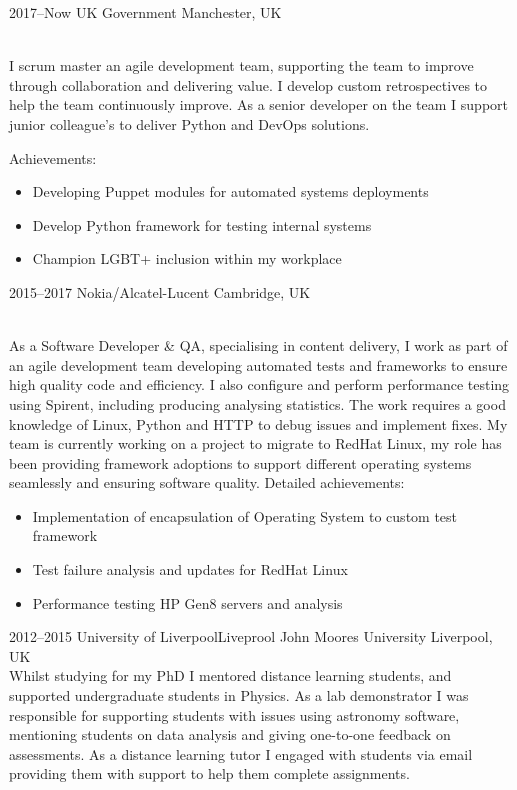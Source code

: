 \documentclass[]{cv-style}          %
\begin{document}
\begin{entrylist}
\entry
  {2017--Now}
  {UK Government}
  {Manchester, UK}
  {\\
  I scrum master an agile development team, supporting the team to improve through collaboration and delivering value.
  I develop custom retrospectives to help the team continuously improve.
  As a senior developer on the team I support junior colleague's to deliver Python and DevOps solutions.

Achievements:
\begin{itemize}
  \item Developing Puppet modules for automated systems deployments
  \item Develop Python framework for testing internal systems
  \item Champion LGBT+ inclusion within my workplace
\end{itemize}
}
\entry
  {2015--2017}
  {Nokia/Alcatel-Lucent}
  {Cambridge, UK}
  {\\
As a Software Developer \& QA, specialising in content delivery, I work as part of an agile development team developing automated tests and frameworks to ensure high quality code and efficiency. I also configure and perform performance testing using Spirent, including producing analysing statistics. The work requires a good knowledge of Linux, Python and HTTP to debug issues and implement fixes. My team is currently working on a project to migrate to RedHat Linux, my role has been providing framework adoptions to support different operating systems seamlessly and ensuring software quality.
Detailed achievements:
\begin{itemize}
  \item Implementation of encapsulation of Operating System to custom test framework
  \item Test failure analysis and updates for RedHat Linux
  \item Performance testing HP Gen8 servers and analysis
\end{itemize}
}
\entry
  {2012--2015}
  {University of Liverpool\/Liveprool John Moores University}
  {Liverpool, UK}
  {\\
  Whilst studying for my PhD I mentored distance learning students, and supported undergraduate students in Physics. As a lab demonstrator I was responsible for supporting students with issues using astronomy software, mentioning students on data analysis and giving one-to-one feedback on assessments.  As a distance learning tutor I engaged with students via email providing them with support to help them complete assignments.\\
  }
\end{entrylist}
\end{document}
